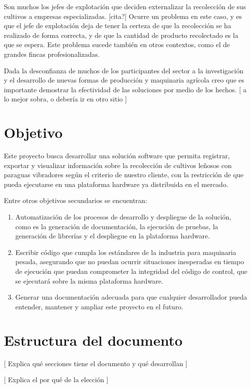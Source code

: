 Son muchos los jefes de explotación que deciden externalizar la recolección
de sus cultivos a empresas especializadas. [cita?] Ocurre un problema en este
caso, y es que el jefe de explotación deja de tener la certeza de que la
recolección se ha realizado de forma correcta, y de que la cantidad de producto
recolectado es la que se espera. Este problema sucede también en otros
contextos, como el de grandes fincas profesionalizadas.

Dada la desconfianza de muchos de los participantes del sector a la investigación y
el desarrollo de nuevas formas de producción y maquinaria agrícola creo que
es importante demostrar la efectividad de las soluciones por medio de los hechos.
[ a lo mejor sobra, o debería ir en otro sitio ]

\section{Objetivo}

Este proyecto busca desarrollar una solución software que permita
registrar, exportar y visualizar información sobre la recolección de cultivos
leñosos con paraguas vibradores según el criterio de nuestro cliente,
con la restricción de que pueda ejecutarse en una plataforma
hardware ya distribuida en el mercado.

Entre otros objetivos secundarios se encuentran:

\begin{enumerate}
    \item Automatización de los procesos de desarrollo y despliegue de la solución, como es
    la generación de documentación, la ejecución de pruebas, la generación de librerías
    y el despliegue en la plataforma hardware.
    \item Escribir código que cumpla los estándares de la industria para maquinaria pesada,
    asegurando que no puedan ocurrir situaciones inesperadas en tiempo de ejecución que puedan
    comprometer la integridad del código de control, que se ejecutará sobre la misma plataforma
    hardware.
    \item Generar una documentación adecuada para que cualquier desarrollador pueda entender,
    mantener y ampliar este proyecto en el futuro.
\end{enumerate}

\section{Estructura del documento}

[ Explica qué secciones tiene el documento y qué desarrollan ]

[ Explica el por qué de la elección ]
